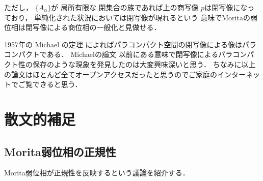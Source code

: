 \documentclass[leqno, a4paper, 12pt]{jsarticle}
\begin{document}
ただし，
$\{A_{\alpha}\}$が
局所有限な
閉集合の族であれば上の商写像
$p$は閉写像になっており，
単純化された状況においては閉写像が現れるという
意味でMoritaの弱位相は閉写像による商位相の一般化と見做せる．

1957年の
Michael の定理
\cite{MR0087079}
によればパラコンパクト空間の閉写像による像はパラコンパクトである．
Michaelの論文
以前にある意味で閉写像によるパラコンパクト性の保存のような現象を発見したのは大変興味深いと思う．
ちなみに以上の論文はほとんど全てオープンアクセスだったと思うのでご家庭のインターネットでご覧できると思う．

\section{散文的補足}

\subsection{Morita弱位相の正規性}

Morita弱位相が正規性を反映するという議論を紹介する．
\end{document}
